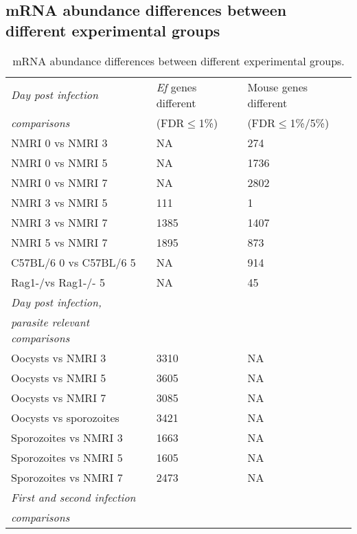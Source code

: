 \documentclass{bmcart}
\begin{document}
\begin{backmatter}

\clearpage
\section*{mRNA abundance differences between different experimental groups}
\setlength{\tabcolsep}{8pt}
\begin{table}[H]
\small
\begin{center}
\caption{mRNA abundance differences between different experimental groups.}
\begin{tabular}{*3l}    \toprule
\textit{Day post infection} & \textit{Ef} genes different & Mouse genes different \\ 
	\textit{comparisons} 	    & (FDR$\leq$1\%) &  (FDR$\leq$1\%/5\%) \\ \midrule
	NMRI 0 vs NMRI 3		& NA   & 274 \\
	NMRI 0 vs NMRI 5		& NA   & 1736 \\
	NMRI 0 vs NMRI 7		& NA   & 2802 \\
	NMRI 3 vs NMRI 5     		& 111  & 1 \\
	NMRI 3 vs NMRI 7  		& 1385 & 1407 \\ 
	NMRI 5 vs NMRI 7  		& 1895 & 873 \\ 
	C57BL/6 0 vs C57BL/6 5		& NA	& 914 \\
	Rag1-/vs Rag1-/- 5		& NA	& 45 \\ \midrule
\textit{Day post infection,} & 		 & 		 \\ 
\textit{parasite relevant comparisons} 	    & 		&  \\ \midrule
	Oocysts vs NMRI 3  	& 3310 & NA \\  
	Oocysts vs NMRI 5	& 3605 & NA \\ 
	Oocysts vs NMRI 7	& 3085 & NA \\ 
	Oocysts vs sporozoites  & 3421 & NA \\
	Sporozoites vs NMRI 3 	& 1663 & NA \\
	Sporozoites vs NMRI 5 	& 1605 & NA \\
	Sporozoites vs NMRI 7 	& 2473 & NA \\ \midrule
\textit{First and second infection} & 		 & 	 \\ 
\textit{comparisons} 	    & 		& 	\\ \midrule

\end{tabular}
\end{center}
\end{table}
\end{backmatter}
\end{document}
